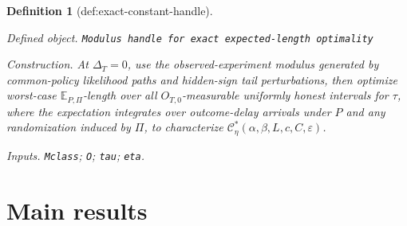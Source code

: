 \documentclass{article}
\newtheorem{definition}{Definition}
\begin{document}
\begin{definition}[def:exact-constant-handle]\label{def:exact-constant-handle}
\par\smallskip\noindent\emph{Defined object.} \texttt{Modulus handle for exact expected-\allowbreak{}length optimality}
\par\smallskip\noindent\emph{Construction.} At \(\Delta_T=0\), use the observed-experiment modulus generated by common-policy likelihood paths and hidden-sign tail perturbations, then optimize worst-case \(\mathbb E_{P,\Pi}\)-length over all \(O_{T,0}\)-measurable uniformly honest intervals for \(\tau\), where the expectation integrates over outcome-delay arrivals under \(P\) and any randomization induced by \(\Pi\), to characterize \(\mathcal C_\eta^*(\alpha,\beta,L,c,C,\varepsilon)\).
\par\smallskip\noindent\emph{Inputs.} \texttt{Mclass}; \texttt{O}; \texttt{tau}; \texttt{eta}.
\end{definition}

\section{Main results}
\end{document}
